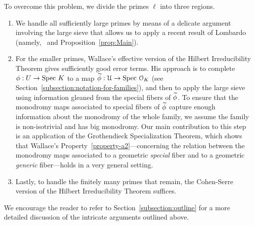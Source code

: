 To overcome this problem, we divide the primes $\ell$ into three regions.
\begin{enumerate}
	\item We handle all sufficiently large primes by means of a delicate argument involving the large sieve that allows us to apply a recent result of Lombardo (namely,~\cite[Theorem 1.2]{lombardo2015explicit} and  Proposition~\ref{prop:Main}).
	\item For the smaller primes, Wallace's effective version of the Hilbert Irreducibility Theorem gives sufficiently good error terms. His approach is to complete $\phi: U \to \text{Spec } K$ to a map $\widetilde{\phi} : \mathcal{U} \to \text{Spec } \mathcal{O}_K$ (see Section~\ref{subsection:notation-for-families}), and then to apply the large sieve using information gleaned from the special fibers of $\widetilde{\phi}$. To ensure that the monodromy maps associated to special fibers of $\widetilde{\phi}$ capture enough information about the monodromy of the whole family, we assume the family is non-isotrivial and has big monodromy.
Our main contribution to this step is an application of the Grothendieck Specialization Theorem, which shows that Wallace's Property~\ref{property-a2}---concerning the relation between the monodromy maps associated to a geometric \emph{special} fiber and to a geometric \emph{generic} fiber---holds in a very general setting.
	\item Lastly, to handle the finitely many primes that remain, the Cohen-Serre version of the Hilbert Irreducibility Theorem suffices.
\end{enumerate}
We encourage the reader to refer to Section~\ref{subsection:outline} for a more detailed discussion of the intricate arguments outlined above.


